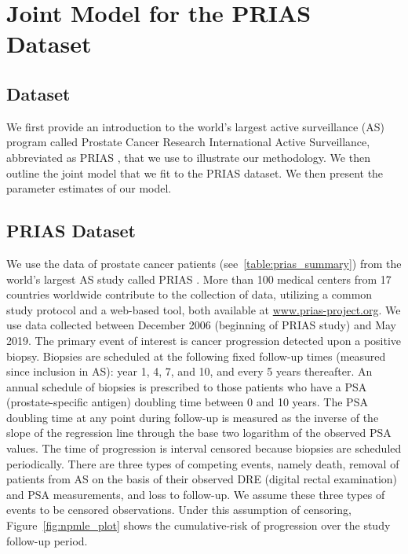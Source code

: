 \section{Joint Model for the PRIAS Dataset}
\label{sec:param_estimates_jm_fit_prias}
\subsection{Dataset}
We first provide an introduction to the world's largest active surveillance (AS) program called Prostate Cancer Research International Active Surveillance, abbreviated as PRIAS \citep{bokhorst2016decade}, that we use to illustrate our methodology. We then outline the joint model that we fit to the PRIAS dataset. We then present the parameter estimates of our model.

\subsection{PRIAS Dataset}
We use the data of prostate cancer patients (see~\ref{table:prias_summary}) from the world's largest AS study called PRIAS \citep{bokhorst2016decade}. More than 100 medical centers from 17 countries worldwide contribute to the collection of data, utilizing a common study protocol and a web-based tool, both available at \url{www.prias-project.org}. We use data collected between December 2006 (beginning of PRIAS study) and May 2019. The primary event of interest is cancer progression detected upon a positive biopsy. Biopsies are scheduled at the following fixed follow-up times (measured since inclusion in AS): year 1, 4, 7, and 10, and every 5 years thereafter. An annual schedule of biopsies is prescribed to those patients who have a PSA (prostate-specific antigen) doubling time between 0 and 10 years. The PSA doubling time at any point during follow-up is measured as the inverse of the slope of the regression line through the base two logarithm of the observed PSA values. The time of progression is interval censored because biopsies are scheduled periodically. There are three types of competing events, namely death, removal of patients from AS on the basis of their observed DRE (digital rectal examination) and PSA measurements, and loss to follow-up. We assume these three types of events to be censored observations. Under this assumption of censoring, Figure~\ref{fig:npmle_plot} shows the cumulative-risk of progression over the study follow-up period.

